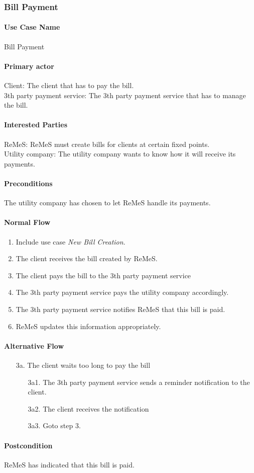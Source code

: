\subsubsection{Bill Payment}

\paragraph{Use Case Name}
Bill Payment
\paragraph{Primary actor}
Client: The client that has to pay the bill.\\
3th party payment service: The 3th party payment service that has to manage the bill.
\paragraph{Interested Parties}
ReMeS: ReMeS must create bills for clients at certain fixed points. \\
Utility company: The utility company wants to know how it will receive its payments.
\paragraph{Preconditions}
The utility company has chosen to let ReMeS handle its payments.
\paragraph{Normal Flow}
\begin{enumerate}
	\item Include use case \textit{New Bill Creation}.
	\item The client receives the bill created by ReMeS.
	\item The client pays the bill to the 3th party payment service
	\item The 3th party payment service pays the utility company accordingly.
	\item The 3th party payment service notifies ReMeS that this bill is paid.
	\item ReMeS updates this information appropriately.
\end{enumerate}

\paragraph{Alternative Flow}
\begin{enumerate}
	\item[3a.] The client waits too long to pay the bill
	\begin{enumerate}
		\item[3a1.] The 3th party payment service sends a reminder notification to the client.
		\item[3a2.] The client receives the notification
		\item[3a3.] Goto step 3.
	\end{enumerate}
\end{enumerate}

\paragraph{Postcondition}
ReMeS has indicated that this bill is paid.
